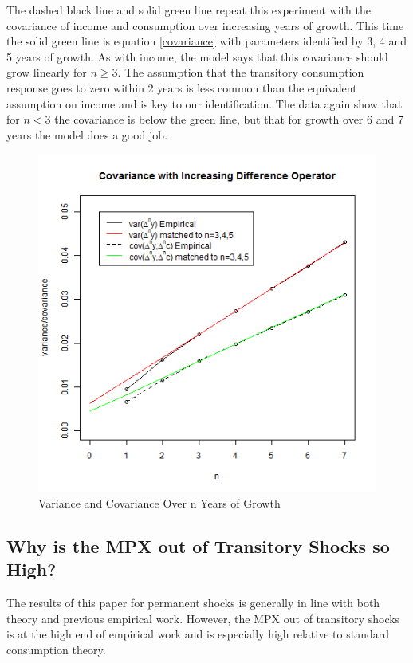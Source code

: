 \documentclass[titlepage]{\econtex}\newcommand{\texname}{IncomeUncertainty}
\begin{document}
The dashed black line and solid green line repeat this experiment with the covariance of income and consumption over increasing years of growth. This time the solid green line is equation \ref{covariance} with parameters identified by 3, 4 and 5 years of growth. As with income, the model says that this covariance should grow linearly for $n \geq 3$. The assumption that the transitory consumption response goes to zero within 2 years is less common than the equivalent assumption on income and is key to our identification. The data again show that for $n < 3$ the covariance is below the green line, but that for growth over 6 and 7 years the model does a good job.
\begin{figure} 
	\begin{centering}
		\includegraphics[scale=0.6]{Figures/IncreasingDiff.png}
		\caption{Variance and Covariance Over n Years of Growth}
		\label{fig:IncreasingDiff}
	\end{centering}
\end{figure}

\subsection{Why is the MPX out of Transitory Shocks so High?} \label{whysohigh}
The results of this paper for permanent shocks is generally in line with both theory and previous empirical work. However, the MPX out of transitory shocks is at the high end of empirical work and is especially high relative to standard consumption theory.
\end{document}
